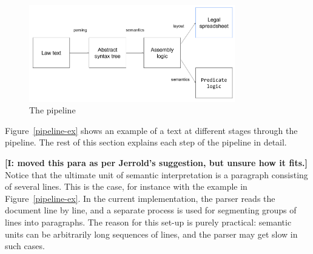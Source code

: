 \documentclass{IOS-Book-Article}
\newcommand{\todoj}[1]{{\color{red}\textbf{[J: #1]}}}
\newcommand{\todoi}[1]{{\color{magenta}\textbf{[I: #1]}}}
\begin{document}
\begin{figure}
    \includegraphics[width=0.8\textwidth]{pipeline.png}
\caption{The pipeline}
\label{pipeline}
\end{figure}

Figure~\ref{pipeline-ex} shows an example of a text at different stages through the pipeline. The rest of this section explains each step of the pipeline in detail.



\todoi{moved this para as per Jerrold's suggestion, but unsure how it fits.}
Notice that the ultimate unit of semantic interpretation is a paragraph consisting of several lines. This is the case, for instance with the example in Figure~\ref{pipeline-ex}.
In the current implementation, the parser reads the document line by line, and a separate process is used for segmenting groups of lines into paragraphs.
The reason for this set-up is purely practical: semantic units can be arbitrarily long sequences of lines, and the parser may get slow in such cases.
\end{document}
